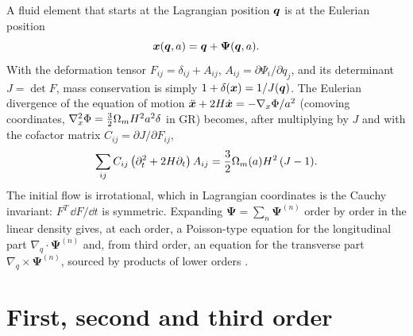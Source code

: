 A fluid element that starts at the Lagrangian position $\bm{q}$ is at the Eulerian position
\begin{equation}
\bm{x}(\bm{q},a)=\bm{q}+\bm\Psi(\bm{q},a).
\end{equation}
With the deformation tensor $F_{ij}=\delta_{ij}+A_{ij}$, $A_{ij}=\partial\Psi_i/\partial q_j$, and its determinant
$J=\det F$, mass conservation is simply $1+\delta(\bm{x})=1/J(\bm{q})$. The Eulerian divergence of the equation of motion
$\ddot{\bm{x}}+2H\dot{\bm{x}}=-\nabla_x\Phi/a^2$ (comoving coordinates, $\nabla^2_x\Phi=\frac32\Omega_mH^2a^2\delta$ in GR) becomes,
after multiplying by $J$ and with the cofactor matrix $C_{ij}=\partial J/\partial F_{ij}$,
\begin{equation}
\sum_{ij}C_{ij}\left(\partial_t^2+2H\partial_t\right)A_{ij}=\frac32\Omega_m(a)H^2\,(J-1).
\label{eq:lpt-longitudinal}
\end{equation}
The initial flow is irrotational, which in Lagrangian coordinates is the Cauchy invariant: $F^T\,\dd F/\dd t$ is
symmetric. Expanding $\bm\Psi=\sum_n\bm\Psi^{(n)}$ order by order in the linear density gives, at each order, a
Poisson-type equation for the longitudinal part $\nabla_q\cdot\bm\Psi^{(n)}$ and, from third order, an equation for
the transverse part $\nabla_q\times\bm\Psi^{(n)}$, sourced by products of lower orders \cite{Bouchet1995,Matsubara2015}.

\section{First, second and third order}\label{sec:lpt-123}

